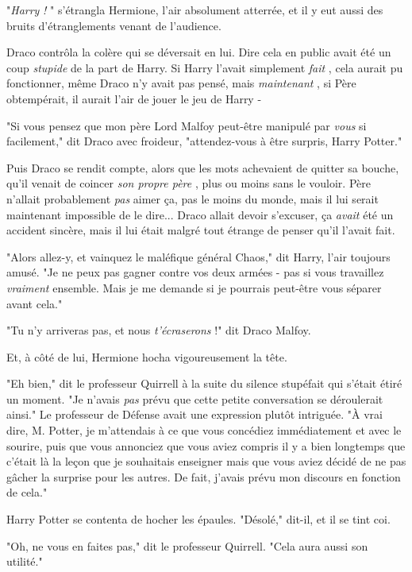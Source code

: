"\emph{Harry}  \emph{!} " s'étrangla Hermione, l'air absolument atterrée, et il y eut aussi des bruits d'étranglements venant de l'audience.

Draco contrôla la colère qui se déversait en lui. Dire cela en public avait été un coup \emph{stupide}  de la part de Harry. Si Harry l'avait simplement \emph{fait} , cela aurait pu fonctionner, même Draco n'y avait pas pensé, mais \emph{maintenant} , si Père obtempérait, il aurait l'air de jouer le jeu de Harry -

"Si vous pensez que mon père Lord Malfoy peut-être manipulé par \emph{vous}  si facilement," dit Draco avec froideur, "attendez-vous à être surpris, Harry Potter."

Puis Draco se rendit compte, alors que les mots achevaient de quitter sa bouche, qu'il venait de coincer \emph{son propre père} , plus ou moins sans le vouloir. Père n'allait probablement \emph{pas}  aimer ça, pas le moins du monde, mais il lui serait maintenant impossible de le dire... Draco allait devoir s'excuser, ça \emph{avait } été un accident sincère, mais il lui était malgré tout étrange de penser qu'il l'avait fait.

"Alors allez-y, et vainquez le maléfique général Chaos," dit Harry, l'air toujours amusé. "Je ne peux pas gagner contre vos deux armées - pas si vous travaillez \emph{vraiment } ensemble. Mais je me demande si je pourrais peut-être vous séparer avant cela."

"Tu n'y arriveras pas, et nous \emph{t'écraserons}  !" dit Draco Malfoy.

Et, à côté de lui, Hermione hocha vigoureusement la tête.

"Eh bien," dit le professeur Quirrell à la suite du silence stupéfait qui s'était étiré un moment. "Je n'avais \emph{pas } prévu que cette petite conversation se déroulerait ainsi." Le professeur de Défense avait une expression plutôt intriguée. "À vrai dire, M. Potter, je m'attendais à ce que vous concédiez immédiatement et avec le sourire, puis que vous annonciez que vous aviez compris il y a bien longtemps que c'était là la leçon que je souhaitais enseigner mais que vous aviez décidé de ne pas gâcher la surprise pour les autres. De fait, j'avais prévu mon discours en fonction de cela."

Harry Potter se contenta de hocher les épaules. "Désolé," dit-il, et il se tint coi.

"Oh, ne vous en faites pas," dit le professeur Quirrell. "Cela aura aussi son utilité."

